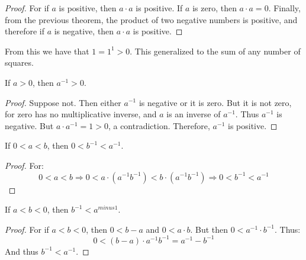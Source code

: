 \documentclass[crop=false,class=book,oneside]{standalone}
\begin{document}
            \begin{proof}
                For if $a$ is positive, then $a\cdot{a}$ is positive.
                If $a$ is zero, then $a\cdot{a}=0$. Finally, from the
                previous theorem, the product of two negative numbers
                is positive, and therefore if $a$ is negative, then
                $a\cdot{a}$ is positive.
            \end{proof}
            From this we have that $1=1^{1}>0$. This generalized to
            the sum of any number of squares.
            \begin{theorem}
                If $a>0$, then $a^{\minus{1}}>0$.
            \end{theorem}
            \begin{proof}
                Suppose not. Then either $a^{\minus{1}}$ is negative
                or it is zero. But it is not zero, for zero has no
                multiplicative inverse, and $a$ is an inverse of
                $a^{\minus{1}}$. Thus $a^{\minus{1}}$ is negative.
                But $a\cdot{a}^{\minus{1}}=1>0$, a contradiction.
                Therefore, $a^{\minus{1}}$ is positive.
            \end{proof}
            \begin{theorem}
                If $0<a<b$, then $0<b^{\minus{1}}<a^{\minus{1}}$.
            \end{theorem}
            \begin{proof}
                For:
                \begin{equation}
                    0<a<b\Longrightarrow
                    0<a\cdot(a^{\minus{1}}b^{\minus{1}})<
                    b\cdot(a^{\minus{1}}b^{\minus{1}})
                    \Longrightarrow
                    0<b^{\minus{1}}<a^{\minus{1}}
                \end{equation}
            \end{proof}
            \begin{theorem}
                If $a<b<0$, then $b^{\minus{1}}<a^{minus{1}}$.
            \end{theorem}
            \begin{proof}
                For if $a<b<0$, then $0<b-a$ and
                $0<a\cdot{b}$. But then
                $0<a^{\minus{1}}\cdot{b}^{\minus{1}}$.
                Thus:
                \begin{equation}
                    0<(b-a)\cdot{a}^{\minus{1}}b^{\minus{1}}=
                    a^{\minus{1}}-b^{\minus{1}}
                \end{equation}
                And thus $b^{\minus{1}}<a^{\minus{1}}$.
            \end{proof}
\end{document}
